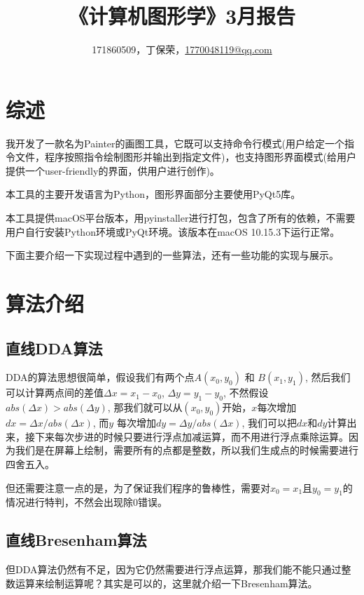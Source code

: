 \documentclass[a4paper,UTF8]{article}
\theoremstyle{definition}
\begin{document}
\title{\textbf{《计算机图形学》3月报告}}
\author{171860509，丁保荣，\href{mailto:1770048119@qq.com}{1770048119@qq.com}}
\maketitle

\tableofcontents

\newpage

\section{综述}
我开发了一款名为Painter的画图工具，它既可以支持命令行模式(用户给定一个指令文件，程序按照指令绘制图形并输出到指定文件)，也支持图形界面模式(给用户提供一个user-friendly的界面，供用户进行创作)。

本工具的主要开发语言为Python，图形界面部分主要使用PyQt5库。

本工具提供macOS平台版本，用pyinstaller进行打包，包含了所有的依赖，不需要用户自行安装Python环境或PyQt环境。该版本在macOS 10.15.3下运行正常。

下面主要介绍一下实现过程中遇到的一些算法，还有一些功能的实现与展示。


\section{算法介绍}

\subsection{直线DDA算法}
DDA的算法思想很简单，假设我们有两个点$A(x_0, y_0)$ 和 $B(x_1, y_1)$, 然后我们可以计算两点间的差值$\Delta x  = x_1 - x_0$, $\Delta y = y_1 - y_0$, 不然假设 $abs(\Delta x) > abs(\Delta y)$, 那我们就可以从$(x_0, y_0)$开始，$x$每次增加$dx = \Delta x / abs(\Delta x)$, 而$y$ 每次增加$dy = \Delta y / abs(\Delta x)$, 我们可以把$dx$和$dy$计算出来，接下来每次步进的时候只要进行浮点加减运算，而不用进行浮点乘除运算。因为我们是在屏幕上绘制，需要所有的点都是整数，所以我们生成点的时候需要进行四舍五入。

但还需要注意一点的是，为了保证我们程序的鲁棒性，需要对$x_0 = x_1$且$y_0 = y_1$的情况进行特判，不然会出现除0错误。


\subsection{直线Bresenham算法}
但DDA算法仍然有不足，因为它仍然需要进行浮点运算，那我们能不能只通过整数运算来绘制运算呢？其实是可以的，这里就介绍一下Bresenham算法\cite{wiki:Bresenham's_line_algorithm}。
\end{document}
